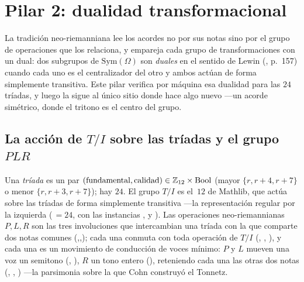 
\section{Pilar 2: dualidad transformacional}\label{sec:pillar2}


La tradición neo-riemanniana lee los acordes no por sus notas sino por el grupo de operaciones que los
relaciona, y empareja cada grupo de transformaciones con un dual: dos subgrupos de $\mathrm{Sym}(\Omega)$
son \emph{duales} en el sentido de Lewin (\cite{Lewin}, p.~157) cuando cada uno es el centralizador del
otro y ambos actúan de forma simplemente transitiva. Este pilar verifica por máquina esa dualidad para las
$24$ tríadas, y luego la sigue al único sitio donde hace algo nuevo ---un acorde simétrico, donde el
tritono es el centro del grupo.

\subsection{La acción de $T/I$ sobre las tríadas y el grupo $PLR$}\label{sec:p2-ti}

Una \emph{tríada} es un par $(\mathrm{fundamental},\mathrm{calidad})\in\mathbb{Z}_{12}\times\mathrm{Bool}$ (mayor
$\{r,r{+}4,r{+}7\}$ o menor $\{r,r{+}3,r{+}7\}$); hay $24$. El grupo $T/I$ es el \,$12$
de Mathlib, que actúa sobre las tríadas de forma simplemente transitiva ---la representación regular por la
izquierda (\,$=24$, con las instancias ,  y
). Las operaciones neo-riemannianas $P,L,R$ son las tres involuciones que intercambian
una tríada con la que comparte dos notas comunes (,,); cada una conmuta con toda
operación de $T/I$ (, , ), y cada una es un movimiento de
conducción de voces mínimo: $P$ y $L$ mueven una voz un semitono (,
), $R$ un tono entero (), reteniendo cada una las otras dos
notas (, , ) ---la parsimonia sobre la que Cohn
\cite{Cohn} construyó el Tonnetz.

